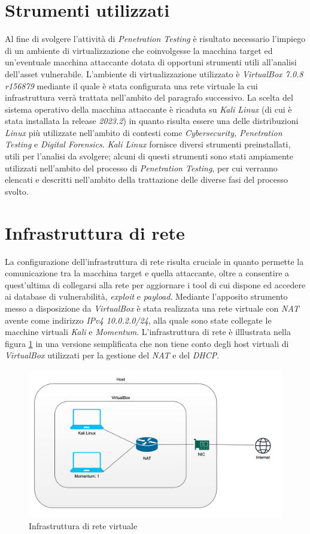 \section{Strumenti utilizzati} 
Al fine di svolgere l'attività di \emph{Penetration Testing} è risultato necessario l'impiego di un ambiente di virtualizzazione che coinvolgesse la macchina target ed un'eventuale macchina attaccante dotata di opportuni strumenti utili all'analisi dell'asset vulnerabile. L'ambiente di virtualizzazione utilizzato è \emph{VirtualBox 7.0.8 r156879} mediante il quale è stata configurata una rete virtuale la cui infrastruttura verrà trattata nell'ambito del paragrafo successivo. La scelta del sistema operativo della macchina attaccante è ricaduta su \emph{Kali Linux} (di cui è stata installata la release \emph{2023.2}) in quanto risulta essere una delle distribuzioni \emph{Linux} più utilizzate nell'ambito di contesti come \emph{Cybersecurity, Penetration Testing} e \emph{Digital Forensics}. \emph{Kali Linux} fornisce diversi strumenti preinstallati, utili per l'analisi da svolgere; alcuni di questi strumenti sono stati ampiamente utilizzati nell'ambito del processo di \emph{Penetration Testing}, per cui verranno elencati e descritti nell'ambito della trattazione delle diverse fasi del processo svolto. 
\section{Infrastruttura di rete} 
La configurazione dell'infrastruttura di rete risulta cruciale in quanto permette la comunicazione tra la macchina target e quella attaccante, oltre a consentire a quest'ultima di collegarsi alla rete per aggiornare i tool di cui dispone ed accedere ai database di vulnerabilità, \emph{exploit} e \emph{payload}. Mediante l'apposito strumento messo a disposizione da \emph{VirtualBox} è stata realizzata una rete virtuale con \emph{NAT} avente come indirizzo \emph{IPv4 10.0.2.0/24}, alla quale sono state collegate le macchine virtuali \emph{Kali} e \emph{Momentum}. L'infrastruttura di rete è illlustrata nella figura \ref{fig:virtualbox} in una versione semplificata che non tiene conto degli host virtuali di \emph{VirtualBox} utilizzati per la gestione del \emph{NAT} e del \emph{DHCP}. 
\begin{figure}[h]
    \centering
    \includegraphics[scale=0.2]{capitoli/images/virtualbox.jpeg}
    \caption{Infrastruttura di rete virtuale}
    \label{fig:virtualbox}
\end{figure}
